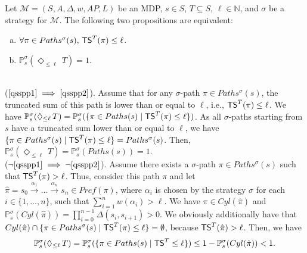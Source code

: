 \begin{theorem} \label{spg-thm1}
  Let $\mathcal{M}=(S, A, \Delta, w, AP, L)$ be an MDP, $s \in S$, $T \subseteq S$, $\ell \in \mathbb{N}$, and $\sigma$ be a strategy for $\mathcal{M}$.
  The following two propositions are equivalent:
  \begin{enumerate}[(a)]
    \item $\forall \pi \in Paths^\sigma(s), \, \text{\sffamily TS}^T(\pi) \leq \ell$. \label{qsspp1}
    \item $\mathbb{P}_s^\sigma(\Diamond_{\leq \ell}\, T) = 1$. \label{qsspp2}
  \end{enumerate}
\end{theorem}
\begin{proof2}$ $\\
  ($\ref{qsspp1}\implies\ref{qsspp2}$). Assume that for any $\sigma$-path $\pi \in Paths^\sigma(s)$, the truncated sum of this path is lower than or equal to $\ell$, i.e., $\text{\sffamily TS}^T(\pi)\leq \ell$.
  We have $\mathbb{P}_s^\sigma(\Diamond_{\leq \ell}\, T) = \mathbb{P}_s^\sigma(\{ \pi \in Paths(s) \; | \; \text{\sffamily TS}^T(\pi) \leq \ell \})$. As all $\sigma$-paths starting from $s$ have a truncated sum lower than or equal to $\ell$, we have $\{\pi \in Paths^\sigma(s) \; | \; \text{\sffamily TS}^T(\pi) \leq \ell \} = Paths^\sigma(s)$.
  Then, $\mathbb{P}_s^\sigma(\Diamond_{\leq \ell}\, T) = \mathbb{P}_s^\sigma(Paths(s)) = 1$. \\
  ($\neg \ref{qsspp1} \implies \neg \ref{qsspp2}$). Assume there exists a $\sigma$-path $\pi \in Paths^\sigma(s)$ such that $\text{\sffamily TS}^T(\pi)>\ell$. Thus, consider this path $\pi$ and let $\hat{\pi} = s_0\xrightarrow{\alpha_1}\dots \xrightarrow{\alpha_n} s_n \in Pref(\pi)$, where $\alpha_i$ is
  chosen by the strategy $\sigma$ for each $i \in \{1, \dots, n \}$, such that $\sum_{i=1}^n w(\alpha_i) > \ell$.
  We have $\pi \in Cyl(\hat{\pi})$ and $\mathbb{P}_s^\sigma(Cyl(\hat{\pi})) = \prod_{i=0}^{n-1} \Delta(s_i, s_{i+1}) > 0$.
  We obviously additionally have that $Cyl(\hat{\pi}) \cap \{ \pi \in Paths^\sigma(s) \; | \; \text{\sffamily TS}^T(\pi) \leq \ell \} = \emptyset$, because %
  $\text{\sffamily TS}^T(\hat{\pi}) > \ell$.
  Then, we have
   \[\mathbb{P}_s^\sigma(\Diamond_{\leq \ell}\, T) = \mathbb{P}_s^\sigma(\{ \pi \in Paths(s) \; | \; \text{\sffamily TS}^T \leq \ell \}) \leq 1 - \mathbb{P}_s^\sigma(Cyl(\hat{\pi})) < 1.\]
\end{proof2}
\\

